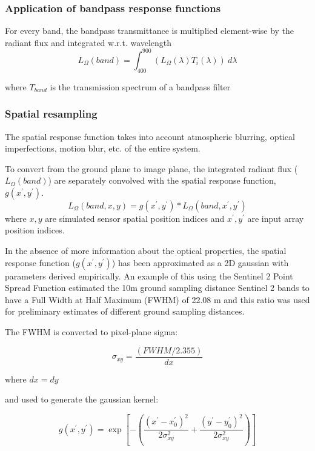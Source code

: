\documentclass[10pt,a4paper,final,onecolumn]{article}
\begin{document}
\subsubsection{Application of bandpass response functions}
For every band, the bandpass transmittance is multiplied element-wise by the radiant flux and integrated w.r.t. wavelength
\begin{equation}
L_{\Omega}(band)= \int_{400}^{900}(L_{\Omega}(\lambda)T_i(\lambda))~d\lambda
\end{equation}

where $T_{band}$ is the transmission spectrum of a bandpass filter

\subsubsection{Spatial resampling}
The spatial response function takes into account atmospheric blurring, optical imperfections, motion blur, etc. of the entire system.

To convert from the ground plane to image plane, the integrated radiant flux ($L_{\Omega}(band)$) are separately convolved with the spatial response function, $g(x^\prime,y^\prime)$.
\begin{equation}
L_{\Omega}(band, x, y) = g(x^\prime, y^\prime) * L_{\Omega}(band, x^\prime, y^\prime)
\end{equation}
where $x, y$ are simulated sensor spatial position indices and $x^{\prime}, y^{\prime}$ are input array position indices.

In the absence of more information about the optical properties, the spatial response function ($g(x^\prime, y^\prime)$) has been approximated as a 2D gaussian with parameters derived empirically. An example of this using the Sentinel 2 Point Spread Function estimated the 10m ground sampling distance Sentinel 2 bands to have a Full Width at Half Maximum (FWHM) of 22.08 m and this ratio was used for preliminary estimates of different ground sampling distances.

The FWHM is converted to pixel-plane sigma:

\begin{equation}
\sigma_{xy} = \frac{(FWHM/2.355)}{dx}
\end{equation}

where $dx = dy$

and used to generate the gaussian kernel:

\begin{equation}
g(x^\prime, y^\prime) =\exp \left[-\left({\frac {(x^\prime-x_{0}^\prime)^{2}}{2\sigma _{xy}^{2}}}+{\frac {(y^\prime-y^\prime_{0})^{2}}{2\sigma _{xy}^{2}}}\right)\right]
\end{equation}
\end{document}
